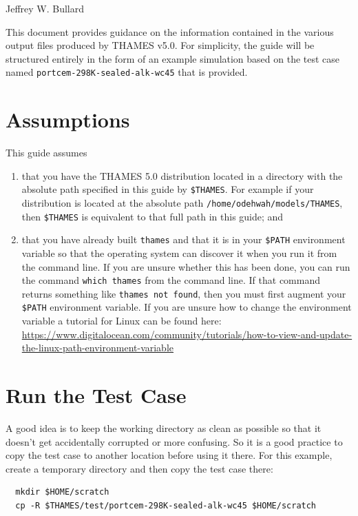 \documentclass{article}
\begin{document}
\lstset{language=XML,stringstyle=\ttfamily}

\begin{center}
	\Large{\textbf{}}
\end{center}
\begin{center}
	\large{Jeffrey W. Bullard}
\end{center}
\begin{center}
	\large{\DTMnow}
\end{center}

\vspace{0.25truein}
\tableofcontents

\vspace{0.25truein}
This document provides guidance on the information contained in the various output files
produced by THAMES v5.0. For simplicity, the guide will be structured entirely
in the form of an example simulation based on the test case named
\verb!portcem-298K-sealed-alk-wc45! that is provided.

\section{\label{sec:assumption} Assumptions}
This guide assumes
\begin{enumerate}
	\item that you have the THAMES 5.0 distribution located in a directory
	      with the absolute path specified in this guide by \verb!$THAMES!. For example
	      if your distribution is located at the absolute path
	      \verb!/home/odehwah/models/THAMES!, then \verb!$THAMES! is equivalent to that
	      full path in this guide; and
	\item that you have already built \verb!thames! and that it is in
	      your \verb!$PATH! environment variable so that the operating system can discover it
	      when you run it from the command line. If you are unsure whether this has been
	      done, you can run the command \verb!which thames! from the command line. If that
	      command returns something like \verb!thames not found!, then you must first
	      augment your \verb!$PATH! environment variable. If you are unsure how to
	      change the environment variable a tutorial for Linux can be found
	      here: \url{https://www.digitalocean.com/community/tutorials/how-to-view-and-update-the-linux-path-environment-variable}
\end{enumerate}

\section{\label{sec:categories} Run the Test Case}
A good idea is to keep the working directory as clean as possible so that it
doesn't get accidentally corrupted or more confusing. So it is a good practice
to copy the test case to another location before using it there. For this
example, create a temporary directory and then copy the test case there:
\scriptsize{
	\begin{lstlisting}
  mkdir $HOME/scratch
  cp -R $THAMES/test/portcem-298K-sealed-alk-wc45 $HOME/scratch
\end{lstlisting}
}
\end{document}
